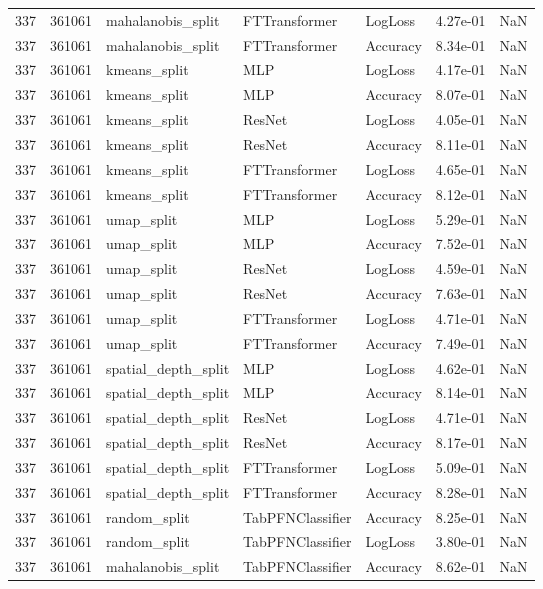 \begin{tabular}{rrlllrr}
337 & 361061 & mahalanobis\_split & FTTransformer & LogLoss & 4.27e-01 & NaN \\
337 & 361061 & mahalanobis\_split & FTTransformer & Accuracy & 8.34e-01 & NaN \\
337 & 361061 & kmeans\_split & MLP & LogLoss & 4.17e-01 & NaN \\
337 & 361061 & kmeans\_split & MLP & Accuracy & 8.07e-01 & NaN \\
337 & 361061 & kmeans\_split & ResNet & LogLoss & 4.05e-01 & NaN \\
337 & 361061 & kmeans\_split & ResNet & Accuracy & 8.11e-01 & NaN \\
337 & 361061 & kmeans\_split & FTTransformer & LogLoss & 4.65e-01 & NaN \\
337 & 361061 & kmeans\_split & FTTransformer & Accuracy & 8.12e-01 & NaN \\
337 & 361061 & umap\_split & MLP & LogLoss & 5.29e-01 & NaN \\
337 & 361061 & umap\_split & MLP & Accuracy & 7.52e-01 & NaN \\
337 & 361061 & umap\_split & ResNet & LogLoss & 4.59e-01 & NaN \\
337 & 361061 & umap\_split & ResNet & Accuracy & 7.63e-01 & NaN \\
337 & 361061 & umap\_split & FTTransformer & LogLoss & 4.71e-01 & NaN \\
337 & 361061 & umap\_split & FTTransformer & Accuracy & 7.49e-01 & NaN \\
337 & 361061 & spatial\_depth\_split & MLP & LogLoss & 4.62e-01 & NaN \\
337 & 361061 & spatial\_depth\_split & MLP & Accuracy & 8.14e-01 & NaN \\
337 & 361061 & spatial\_depth\_split & ResNet & LogLoss & 4.71e-01 & NaN \\
337 & 361061 & spatial\_depth\_split & ResNet & Accuracy & 8.17e-01 & NaN \\
337 & 361061 & spatial\_depth\_split & FTTransformer & LogLoss & 5.09e-01 & NaN \\
337 & 361061 & spatial\_depth\_split & FTTransformer & Accuracy & 8.28e-01 & NaN \\
337 & 361061 & random\_split & TabPFNClassifier & Accuracy & 8.25e-01 & NaN \\
337 & 361061 & random\_split & TabPFNClassifier & LogLoss & 3.80e-01 & NaN \\
337 & 361061 & mahalanobis\_split & TabPFNClassifier & Accuracy & 8.62e-01 & NaN \\

\end{tabular}
